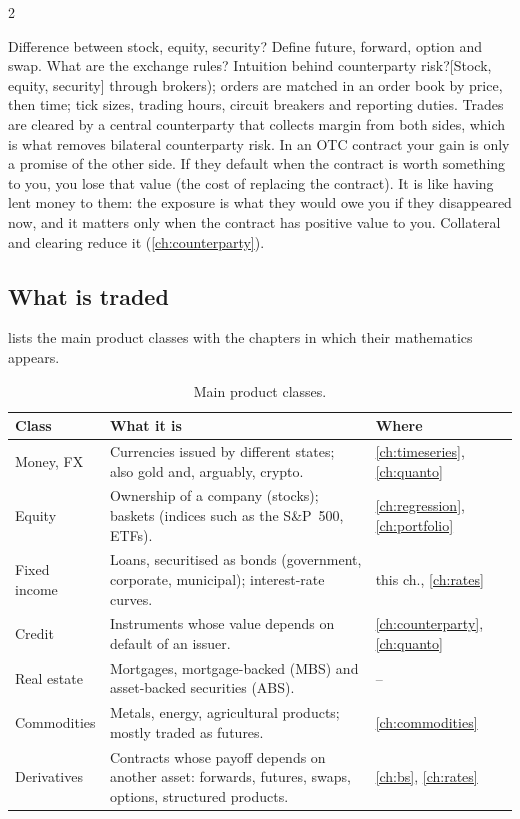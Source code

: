 \begin{paracol}{2}
\begin{answer}{Difference between stock, equity, security? Define future, forward, option and swap. What are the exchange rules? Intuition behind counterparty risk?}[Stock, equity, security]
        through brokers); orders are matched in an order book by price, then time; tick sizes,
        trading hours, circuit breakers and reporting duties. Trades are cleared by a central
        counterparty that collects margin from both sides, which is what removes bilateral
        counterparty risk.
In an OTC contract your gain is only a promise of the other
        side. If they default when the contract is worth something to you, you lose that value
        (the cost of replacing the contract). It is like having lent money to them: the exposure is
        what they would owe you if they disappeared now, and it matters only when the contract has
        positive value to you. Collateral and clearing reduce it (\cref{ch:counterparty}).
\end{answer}

\subsection{What is traded}
 lists the main product classes with the chapters in which their
mathematics appears.

\begin{table}[ht]
\centering\small
\caption{Main product classes.}\label{tab:products}
\begin{tabularx}{\linewidth}{@{}l X l@{}}
\toprule
\textbf{Class} & \textbf{What it is} & \textbf{Where}\\
\midrule
Money, FX & Currencies issued by different states; also gold and, arguably, crypto. & \ref{ch:timeseries}, \ref{ch:quanto}\\
Equity & Ownership of a company (stocks); baskets (indices such as the S\&P~500, ETFs). & \ref{ch:regression}, \ref{ch:portfolio}\\
Fixed income & Loans, securitised as bonds (government, corporate, municipal); interest-rate curves. & this ch., \ref{ch:rates}\\
Credit & Instruments whose value depends on default of an issuer. & \ref{ch:counterparty}, \ref{ch:quanto}\\
Real estate & Mortgages, mortgage-backed (MBS) and asset-backed securities (ABS). & --\\
Commodities & Metals, energy, agricultural products; mostly traded as futures. & \ref{ch:commodities}\\
Derivatives & Contracts whose payoff depends on another asset: forwards, futures, swaps, options, structured products. & \ref{ch:bs}, \ref{ch:rates}\\
\bottomrule
\end{tabularx}
\end{table}



\end{paracol}
